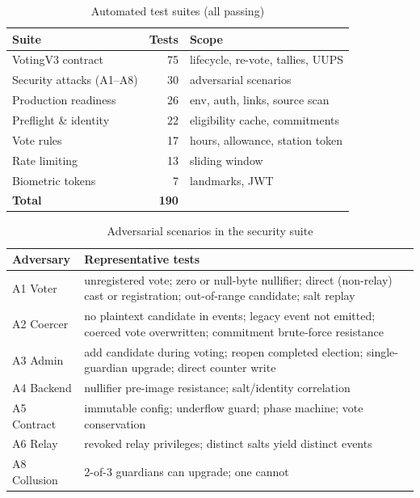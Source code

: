 \documentclass[conference]{IEEEtran}
\begin{document}
\begin{table}[t]
\caption{Automated test suites (all passing)}
\label{tab:tests}
\centering
\footnotesize
\begin{tabular}{@{}lrl@{}}
\toprule
\textbf{Suite} & \textbf{Tests} & \textbf{Scope} \\
\midrule
VotingV3 contract & 75 & lifecycle, re-vote, tallies, UUPS \\
Security attacks (A1--A8) & 30 & adversarial scenarios \\
Production readiness & 26 & env, auth, links, source scan \\
Preflight \& identity & 22 & eligibility cache, commitments \\
Vote rules & 17 & hours, allowance, station token \\
Rate limiting & 13 & sliding window \\
Biometric tokens & 7 & landmarks, JWT \\
\midrule
\textbf{Total} & \textbf{190} & \\
\bottomrule
\end{tabular}
\end{table}

\begin{table}[t]
\caption{Adversarial scenarios in the security suite}
\label{tab:attacks}
\centering
\footnotesize
\begin{tabular}{@{}p{1.6cm}p{6.35cm}@{}}
\toprule
\textbf{Adversary} & \textbf{Representative tests} \\
\midrule
A1 Voter & unregistered vote; zero or null-byte nullifier; direct (non-relay) cast or registration; out-of-range candidate; salt replay \\
A2 Coercer & no plaintext candidate in events; legacy event not emitted; coerced vote overwritten; commitment brute-force resistance \\
A3 Admin & add candidate during voting; reopen completed election; single-guardian upgrade; direct counter write \\
A4 Backend & nullifier pre-image resistance; salt/identity correlation \\
A5 Contract & immutable config; underflow guard; phase machine; vote conservation \\
A6 Relay & revoked relay privileges; distinct salts yield distinct events \\
A8 Collusion & 2-of-3 guardians can upgrade; one cannot \\
\bottomrule
\end{tabular}
\end{table}
\end{document}
